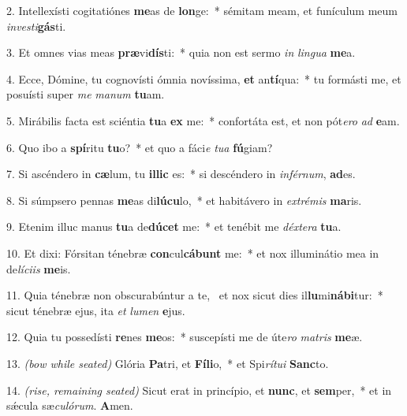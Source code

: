 	2. Intellexísti cogitatiónes \textbf{me}as de \textbf{lon}ge:~* sémitam meam, et funículum meum\\ \textit{in}\textit{ves}\textit{ti}\textbf{gás}ti.

	3. Et omnes vias meas \textbf{præ}vi\textbf{dís}ti:~* quia non est sermo \textit{in} \textit{lin}\textit{gua} \textbf{me}a.

	4. Ecce, Dómine, tu cognovísti ómnia novíssima, \textbf{et} an\textbf{tí}qua:~* tu formásti me, et posuísti super \textit{me} \textit{ma}\textit{num} \textbf{tu}am.

	5. Mirábilis facta est sciéntia \textbf{tu}a \textbf{ex} me:~* confortáta est, et non pót\textit{e}\textit{ro} \textit{ad} \textbf{e}am.

	6. Quo ibo a \textbf{spí}ritu \textbf{tu}o?~* et quo a fáci\textit{e} \textit{tu}\textit{a} \textbf{fú}giam?

	7. Si ascéndero in \textbf{cæ}lum, tu \textbf{il}\textbf{lic} es:~* si descéndero in \textit{in}\textit{fér}\textit{num}, \textbf{ad}es.

	8. Si súmpsero pennas \textbf{me}as di\textbf{lú}\textbf{cu}lo,~* et habitávero in \textit{ex}\textit{tré}\textit{mis} \textbf{ma}ris.

	9. Etenim illuc manus \textbf{tu}a de\textbf{dú}\textbf{cet} me:~* et tenébit me \textit{déx}\textit{te}\textit{ra} \textbf{tu}a.

	10. Et dixi: Fórsitan ténebræ \textbf{con}cul\textbf{cá}\textbf{bunt} me:~* et nox illuminátio mea in de\textit{lí}\textit{ci}\textit{is} \textbf{me}is.
	
	11. Quia ténebræ non obscurabúntur a te,~{\color{red}\GreDagger} et nox sicut dies il\textbf{lu}mi\textbf{ná}\textbf{bi}tur:~* sicut ténebræ ejus, ita \textit{et} \textit{lu}\textit{men} \textbf{e}jus.
	
	12. Quia tu possedísti \textbf{re}nes \textbf{me}os:~* suscepísti me de úte\textit{ro} \textit{ma}\textit{tris} \textbf{me}æ.
	
	13. {\color{red}\textit{(bow while seated)}} Glória \textbf{Pa}tri, et \textbf{Fí}\textbf{li}o,~* et Spi\textit{rí}\textit{tu}\textit{i} \textbf{Sanc}to.
	
	14. {\color{red}\textit{(rise, remaining seated)}} Sicut erat in princípio, et \textbf{nunc}, et \textbf{sem}per,~* et in s\'{\ae}cula sæ\textit{cu}\textit{ló}\textit{rum}. \textbf{A}men.